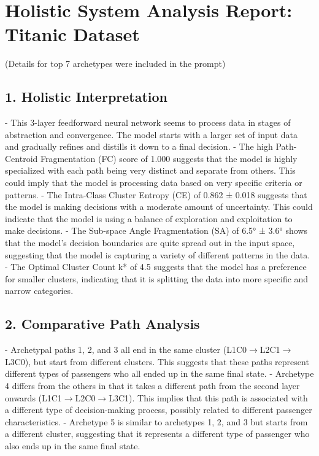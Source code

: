 \section*{Holistic System Analysis Report: Titanic Dataset}
(Details for top 7 archetypes were included in the prompt)

\subsection*{1. Holistic Interpretation}
- This 3-layer feedforward neural network seems to process data in stages of abstraction and convergence. The model starts with a larger set of input data and gradually refines and distills it down to a final decision.
- The high Path-Centroid Fragmentation (FC) score of 1.000 suggests that the model is highly specialized with each path being very distinct and separate from others. This could imply that the model is processing data based on very specific criteria or patterns.
- The Intra-Class Cluster Entropy (CE) of 0.862 ± 0.018 suggests that the model is making decisions with a moderate amount of uncertainty. This could indicate that the model is using a balance of exploration and exploitation to make decisions.
- The Sub-space Angle Fragmentation (SA) of 6.5° ± 3.6° shows that the model's decision boundaries are quite spread out in the input space, suggesting that the model is capturing a variety of different patterns in the data.
- The Optimal Cluster Count k* of 4.5 suggests that the model has a preference for smaller clusters, indicating that it is splitting the data into more specific and narrow categories.

\subsection*{2. Comparative Path Analysis}
- Archetypal paths 1, 2, and 3 all end in the same cluster (L1C0$\rightarrow$L2C1$\rightarrow$L3C0), but start from different clusters. This suggests that these paths represent different types of passengers who all ended up in the same final state.
- Archetype 4 differs from the others in that it takes a different path from the second layer onwards (L1C1$\rightarrow$L2C0$\rightarrow$L3C1). This implies that this path is associated with a different type of decision-making process, possibly related to different passenger characteristics.
- Archetype 5 is similar to archetypes 1, 2, and 3 but starts from a different cluster, suggesting that it represents a different type of passenger who also ends up in the same final state.

